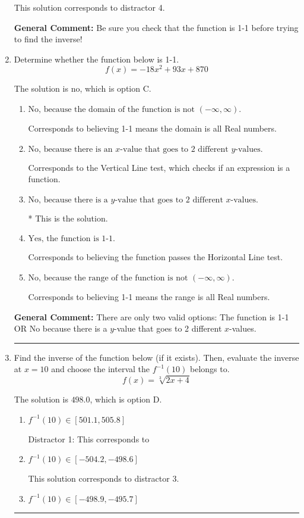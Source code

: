 \documentclass{extbook}[14pt]
\newcommand{\litem}[1]{\item #1

\rule{\textwidth}{0.4pt}}
\begin{document}
\begin{enumerate}
{\begin{enumerate}[label=\Alph*.]
 This solution corresponds to distractor 4.
\end{enumerate}

\textbf{General Comment:} Be sure you check that the function is 1-1 before trying to find the inverse!
}
\litem{
Determine whether the function below is 1-1.
\[ f(x) = -18 x^2 + 93 x + 870 \]

The solution is \( \text{no} \), which is option C.\begin{enumerate}[label=\Alph*.]
\item \( \text{No, because the domain of the function is not $(-\infty, \infty)$.} \)

Corresponds to believing 1-1 means the domain is all Real numbers.
\item \( \text{No, because there is an $x$-value that goes to 2 different $y$-values.} \)

Corresponds to the Vertical Line test, which checks if an expression is a function.
\item \( \text{No, because there is a $y$-value that goes to 2 different $x$-values.} \)

* This is the solution.
\item \( \text{Yes, the function is 1-1.} \)

Corresponds to believing the function passes the Horizontal Line test.
\item \( \text{No, because the range of the function is not $(-\infty, \infty)$.} \)

Corresponds to believing 1-1 means the range is all Real numbers.
\end{enumerate}

\textbf{General Comment:} There are only two valid options: The function is 1-1 OR No because there is a $y$-value that goes to 2 different $x$-values.
}
\litem{
Find the inverse of the function below (if it exists). Then, evaluate the inverse at $x = 10$ and choose the interval the $f^{-1}(10)$ belongs to.
\[ f(x) = \sqrt[3]{2 x + 4} \]

The solution is \( 498.0 \), which is option D.\begin{enumerate}[label=\Alph*.]
\item \( f^{-1}(10) \in [501.1, 505.8] \)

 Distractor 1: This corresponds to 
\item \( f^{-1}(10) \in [-504.2, -498.6] \)

 This solution corresponds to distractor 3.
\item \( f^{-1}(10) \in [-498.9, -495.7] \)


\end{enumerate}}
\end{enumerate}
\end{document}
